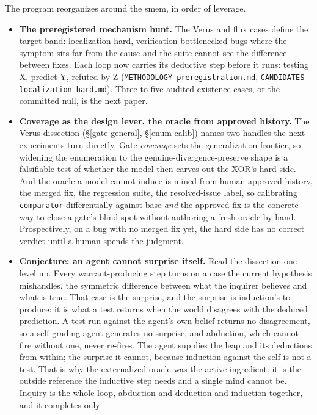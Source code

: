 \documentclass[
  10pt,
]{article}
\providecommand{\tightlist}{%
  \setlength{\itemsep}{0pt}\setlength{\parskip}{0pt}}
\begin{document}
The program reorganizes around the smem, in order of leverage.

\begin{itemize}
\tightlist
\item
  \textbf{The preregistered mechanism hunt.} The Verus and flux cases
  define the target band: localization-hard, verification-bottlenecked
  bugs where the symptom sits far from the cause and the suite cannot
  see the difference between fixes. Each loop now carries its deductive
  step before it runs: testing X, predict Y, refuted by Z
  (\texttt{METHODOLOGY-preregistration.md},
  \texttt{CANDIDATES-localization-hard.md}). Three to five audited
  existence cases, or the committed null, is the next paper.
\item
  \textbf{Coverage as the design lever, the oracle from approved
  history.} The Verus dissection (\S\ref{gate-general},
  \S\ref{enum-calib}) names two handles the next experiments turn
  directly. Gate \emph{coverage} sets the generalization frontier, so
  widening the enumeration to the genuine-divergence-preserve shape is a
  falsifiable test of whether the model then carves out the XOR's hard
  side. And the oracle a model cannot induce is mined from
  human-approved history, the merged fix, the regression suite, the
  resolved-issue label, so calibrating \texttt{comparator} differentially
  against base \emph{and} the approved fix is the concrete way to close
  a gate's blind spot without authoring a fresh oracle by hand.
  Prospectively, on a bug with no merged fix yet, the hard side has no
  correct verdict until a human spends the judgment.
\item
  \textbf{Conjecture: an agent cannot surprise itself.} Read the
  dissection one level up. Every warrant-producing step turns on a case
  the current hypothesis mishandles, the symmetric difference between
  what the inquirer believes and what is true. That case is the
  surprise, and the surprise is induction's to produce: it is what a
  test returns when the world disagrees with the deduced prediction. A
  test run against the agent's own belief returns no disagreement, so a
  self-grading agent generates no surprise, and abduction, which cannot
  fire without one, never re-fires. The agent supplies the leap and its
  deductions from within; the surprise it cannot, because induction
  against the self is not a test. That is why the externalized oracle
  was the active ingredient: it is the outside reference the inductive
  step needs and a single mind cannot be. Inquiry is the whole loop,
  abduction and deduction and induction together, and it completes only

\end{itemize}
\end{document}
